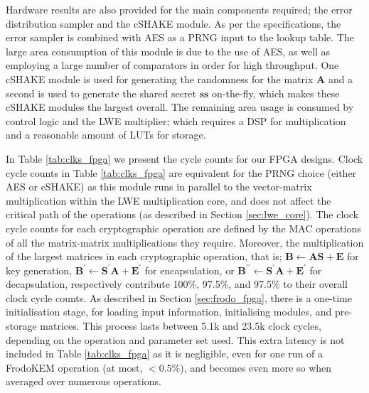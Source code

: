 Hardware results are also provided for the main components required; the error distribution sampler and the cSHAKE module. As per the specifications, the error sampler is combined with AES as a PRNG input to the lookup table. The large area consumption of this module is due to the use of AES, as well as employing a large number of comparators in order for high throughput. One cSHAKE module is used for generating the randomness for the matrix $\mathbf{A}$ and a second is used to generate the shared secret $\mathbf{ss}$ on-the-fly, which makes these cSHAKE modules the largest overall. The remaining area usage is consumed by control logic and the LWE multiplier; which requires a DSP for multiplication and a reasonable amount of LUTs for storage.


In Table \ref{tab:clks_fpga} we present the cycle counts for our FPGA designs. Clock cycle counts in Table \ref{tab:clks_fpga} are equivalent for the PRNG choice (either AES or cSHAKE) as this module runs in parallel to the vector-matrix multiplication within the LWE multiplication core, and does not affect the critical path of the operations (as described in Section \ref{sec:lwe_core}). The clock cycle counts for each cryptographic operation are defined by the MAC operations of all the matrix-matrix multiplications they require. Moreover, the multiplication of the largest matrices in each cryptographic operation, that is; $\mathbf{B} \leftarrow \mathbf{A} \mathbf{S} + \mathbf{E}$ for key generation, $\mathbf{B}^\prime \leftarrow \mathbf{S}^\prime \mathbf{A} + \mathbf{E}^\prime$ for encapsulation, or $\mathbf{B}^{\prime\prime} \leftarrow \mathbf{S}^\prime \mathbf{A} + \mathbf{E}^\prime$ for decapsulation, respectively contribute 100\%, 97.5\%, and 97.5\% to their overall clock cycle counts. As described in Section \ref{sec:frodo_fpga}, there is a one-time initialisation stage, for loading input information, initialising modules, and pre-storage matrices. This process lasts between 5.1k and 23.5k clock cycles, depending on the operation and parameter set used. This extra latency is not included in Table \ref{tab:clks_fpga} as it is negligible, even for one run of a \textsf{FrodoKEM} operation (at most, $< 0.5 \%$), and becomes even more so when averaged over numerous operations.


